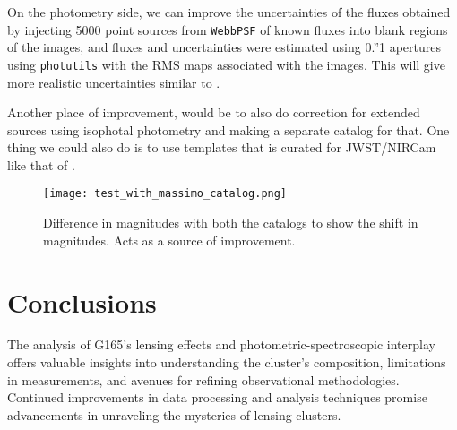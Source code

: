 \documentclass[twocolumn,linenumbers]{aastex631}
\begin{document}
On the photometry side, we can improve the uncertainties of the fluxes obtained by injecting 5000 point sources from \texttt{WebbPSF} of known fluxes into blank regions of the images, and fluxes and uncertainties were estimated using 0.''1 apertures using \texttt{photutils} with the RMS maps associated with the images. This will give more realistic uncertainties similar to \cite{frye2023jwst}.

Another place of improvement, would be to also do correction for extended sources using isophotal photometry and making a separate catalog for that. One thing we could also do is to use templates that is curated for JWST/NIRCam like that of \cite{larson2023spectral}.

\begin{figure}[h]
    \centering
    \texttt{[image: test\_with\_massimo\_catalog.png]}
    \caption{Difference in magnitudes with both the catalogs to show the shift in magnitudes. Acts as a source of improvement.}
    \label{fig:enter-label}
\end{figure}

\section{Conclusions}

The analysis of G165's lensing effects and photometric-spectroscopic interplay offers valuable insights into understanding the cluster's composition, limitations in measurements, and avenues for refining observational methodologies. Continued improvements in data processing and analysis techniques promise advancements in unraveling the mysteries of lensing clusters.

\end{document}
